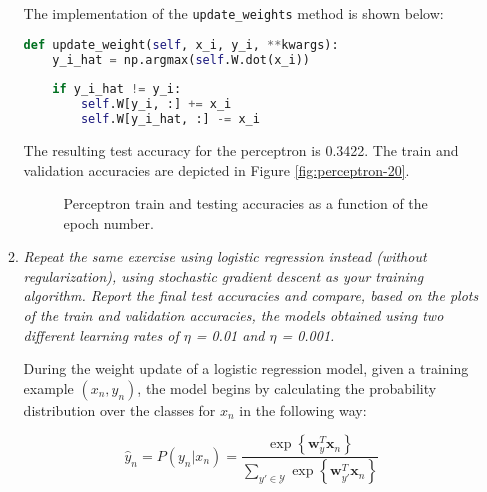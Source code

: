 \documentclass[12pt]{article}
\begin{document}
\begin{enumerate}[leftmargin=\labelsep]
\begin{enumerate}[label=\alph*)]
                    The implementation of the \texttt{update\_weights} method is shown below:

                    \begin{lstlisting}[language=Python]
def update_weight(self, x_i, y_i, **kwargs):
    y_i_hat = np.argmax(self.W.dot(x_i))
    
    if y_i_hat != y_i:
        self.W[y_i, :] += x_i 
        self.W[y_i_hat, :] -= x_i\end{lstlisting}

                    \vspace{12pt}

                    The resulting test accuracy for the perceptron is 0.3422. The train and validation accuracies are depicted in Figure \ref{fig:perceptron-20}.

                    \begin{figure}[H]
                        \centering
                        
                        \caption{Perceptron train and testing accuracies as a function of the epoch number.}
                        \label{fig:perceptron-20-1.0}
                    \end{figure}

                    \vspace{12pt}

              \item \textit{Repeat the same exercise using logistic regression instead (without regularization), using stochastic gradient descent as your training algorithm.  Report the final test accuracies and compare, based on the plots of the train and validation accuracies, the models obtained using two different learning rates of $\eta$ = 0.01 and $\eta$ = 0.001.}

                    \vspace{12pt}

                    During the weight update of a logistic regression model, given a training example $(x_n, y_n)$, the model begins by calculating the probability distribution over the classes for $x_n$ in the following way:

                    \begin{equation}
                        \hat{y}_n = P(y_n | x_n) = \frac{\exp \left\{ \mathbf{w}_y^T \mathbf{x}_n \right\}}{\sum\limits_{y' \in \mathcal{Y}} \exp \left\{ \mathbf{w}_{y'}^T \mathbf{x}_n \right\}}
                    \end{equation}


\end{enumerate}
\end{enumerate}
\end{document}
